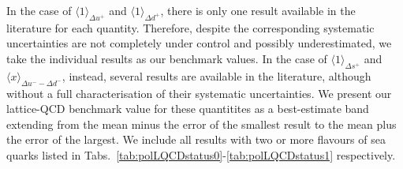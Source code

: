 In the case of $\langle 1 \rangle_{\Delta u^+}$ and $\langle 1 \rangle_{\Delta d^+}$,
there is only one result available in the literature for each quantity.
%
Therefore, despite the corresponding systematic uncertainties are not 
completely under control and possibly underestimated, we take the individual 
results as our benchmark values.
%
In the case of $\langle 1 \rangle_{\Delta s^+}$ and 
$\langle x \rangle_{\Delta u^- - \Delta d^-}$, instead, several results are available
in the literature, although without a full characterisation of
their systematic uncertainties.
%
We present our lattice-QCD benchmark value for these quantitites as
a best-estimate band extending from the mean minus the error of the 
smallest result to the mean plus the error of the largest. 
%
We include all results with two or more flavours of sea quarks listed in 
Tabs.~\ref{tab:polLQCDstatus0}-\ref{tab:polLQCDstatus1} respectively.

